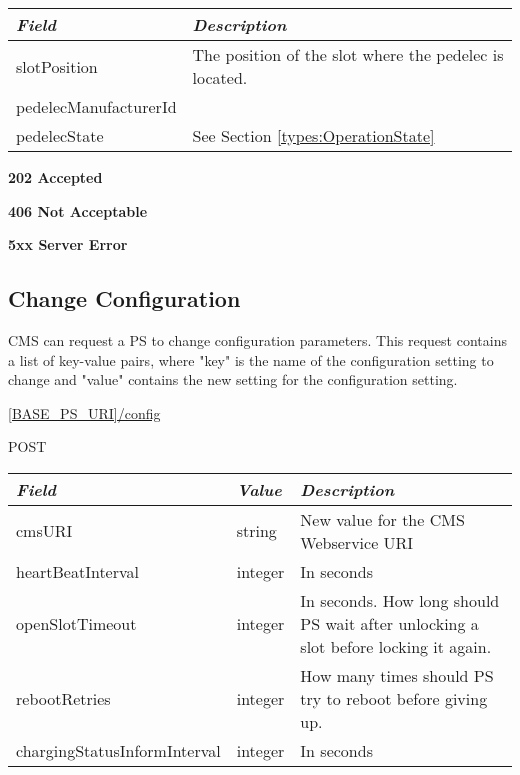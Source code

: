 \begin{table}[!h]
\vspace{-7mm}
\begin{tabularx}{\linewidth}{ | l | X | }
  \hline
  \textit{Field} & \textit{Description} \\
  \hline \hline
  slotPosition	& The position of the slot where the pedelec is located. \\
  pedelecManufacturerId		&  \\
  pedelecState 			& See Section \ref{types:OperationState} \\
  \hline
\end{tabularx}
\end{table}

 \textbf{202 Accepted}

 \textbf{406 Not Acceptable}

\textbf{5xx Server Error}

\subsection{Change Configuration}
\label{cms:change-conf}

\acs{CMS} can request a \acs{PS} to change configuration parameters. This request contains a list of key-value pairs, where "key" is the name of the configuration setting to change and "value" contains the new setting for the configuration setting.

 \url{[BASE_PS_URI]/config}

 POST

\newpage
{} 
\begin{table}[!h]
\vspace{-7mm}
\begin{tabularx}{\linewidth}{ | l | l | X | }
  \hline
  \textit{Field} & \textit{Value} &\textit{Description} \\
  \hline \hline
  cmsURI 			& string 		& New value for the \acs{CMS} Webservice URI \\
  heartBeatInterval 			& integer 		& In seconds \\
  openSlotTimeout 			& integer 		& In seconds. How long should \acs{PS} wait after unlocking a slot before locking it again. \\
  rebootRetries 				& integer 		& How many times should \acs{PS} try to reboot before giving up.\\
  chargingStatusInformInterval 	& integer 		& In seconds \\
  \hline
\end{tabularx}
\end{table}

